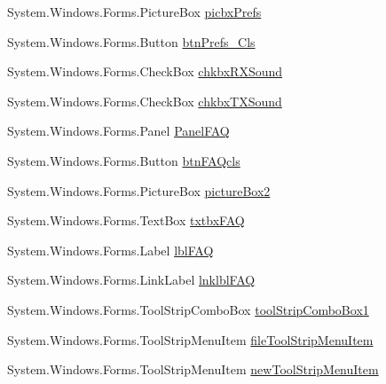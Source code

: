 \begin{DoxyCompactItemize}
\item 
\-System.\-Windows.\-Forms.\-Picture\-Box \hyperlink{class_sr_p___classroom_inq_1_1frm_classrrom_inq_ad71fe1b1dd90eb59594ecf4a175e1b03}{picbx\-Prefs}
\item 
\-System.\-Windows.\-Forms.\-Button \hyperlink{class_sr_p___classroom_inq_1_1frm_classrrom_inq_ab11e101a873395b24e8894ac84d7d318}{btn\-Prefs\-\_\-\-Cls}
\item 
\-System.\-Windows.\-Forms.\-Check\-Box \hyperlink{class_sr_p___classroom_inq_1_1frm_classrrom_inq_af7626aaecde3bb58d5cfee3957410aa8}{chkbx\-R\-X\-Sound}
\item 
\-System.\-Windows.\-Forms.\-Check\-Box \hyperlink{class_sr_p___classroom_inq_1_1frm_classrrom_inq_a63062a732e40b85f40aa3ba57d80223a}{chkbx\-T\-X\-Sound}
\item 
\-System.\-Windows.\-Forms.\-Panel \hyperlink{class_sr_p___classroom_inq_1_1frm_classrrom_inq_ae18ea5d89fce8227797626585e3e2a1a}{\-Panel\-F\-A\-Q}
\item 
\-System.\-Windows.\-Forms.\-Button \hyperlink{class_sr_p___classroom_inq_1_1frm_classrrom_inq_a1c53d39fe22e25d8c00aa7d8c97eb9a8}{btn\-F\-A\-Qcls}
\item 
\-System.\-Windows.\-Forms.\-Picture\-Box \hyperlink{class_sr_p___classroom_inq_1_1frm_classrrom_inq_aeb268a5866f810521414bd3fd047ca72}{picture\-Box2}
\item 
\-System.\-Windows.\-Forms.\-Text\-Box \hyperlink{class_sr_p___classroom_inq_1_1frm_classrrom_inq_a891afdbfba3ee4c1b690b938693ecabe}{txtbx\-F\-A\-Q}
\item 
\-System.\-Windows.\-Forms.\-Label \hyperlink{class_sr_p___classroom_inq_1_1frm_classrrom_inq_ab8a84057dad27dc977240ce7f96187c3}{lbl\-F\-A\-Q}
\item 
\-System.\-Windows.\-Forms.\-Link\-Label \hyperlink{class_sr_p___classroom_inq_1_1frm_classrrom_inq_a1e6a5b0878f7c27c5d8f83941f5ba05b}{lnklbl\-F\-A\-Q}
\item 
\-System.\-Windows.\-Forms.\-Tool\-Strip\-Combo\-Box \hyperlink{class_sr_p___classroom_inq_1_1frm_classrrom_inq_a0488696265840798a7bfd3cc7475f0af}{tool\-Strip\-Combo\-Box1}
\item 
\-System.\-Windows.\-Forms.\-Tool\-Strip\-Menu\-Item \hyperlink{class_sr_p___classroom_inq_1_1frm_classrrom_inq_a4aac2987ba1f61ee4bde4d91cdf35476}{file\-Tool\-Strip\-Menu\-Item}
\item 
\-System.\-Windows.\-Forms.\-Tool\-Strip\-Menu\-Item \hyperlink{class_sr_p___classroom_inq_1_1frm_classrrom_inq_ac3197c0c505ec97395ace77a88a8c068}{new\-Tool\-Strip\-Menu\-Item}

\end{DoxyCompactItemize}

